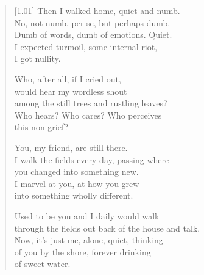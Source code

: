 \begin{verse}[1.01\textwidth]
Then I walked home, quiet and numb.\\
No, not numb, per se, but perhaps dumb.\\
Dumb of words, dumb of emotions. Quiet.\\
I expected turmoil, some internal riot,\\
I got nullity.

Who, after all, if I cried out,\\
would hear my wordless shout\\
among the still trees and rustling leaves?\\
Who hears? Who cares? Who perceives\\
this non-grief?

You, my friend, are still there.\\
I walk the fields every day, passing where\\
you changed into something new.\\
I marvel at you, at how you grew\\
into something wholly different.

Used to be you and I daily would walk\\
through the fields out back of the house and talk.\\
Now, it's just me, alone, quiet, thinking\\
of you by the shore, forever drinking\\
of sweet water.
\end{verse}
